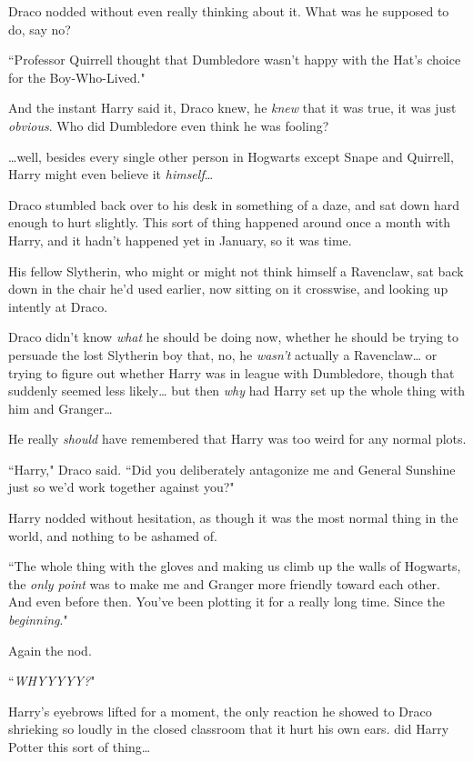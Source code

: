 Draco nodded without even really thinking about it. What was he supposed to do, say no?

``Professor Quirrell thought that Dumbledore wasn't happy with the Hat's choice for the Boy-Who-Lived."

And the instant Harry said it, Draco knew, he \emph{knew} that it was true, it was just \emph{obvious}. Who did Dumbledore even think he was fooling?

{\ldots}well, besides every single other person in Hogwarts except Snape and Quirrell, Harry might even believe it \emph{himself}{\ldots}

Draco stumbled back over to his desk in something of a daze, and sat down hard enough to hurt slightly. This sort of thing happened around once a month with Harry, and it hadn't happened yet in January, so it was time.

His fellow Slytherin, who might or might not think himself a Ravenclaw, sat back down in the chair he'd used earlier, now sitting on it crosswise, and looking up intently at Draco.

Draco didn't know \emph{what} he should be doing now, whether he should be trying to persuade the lost Slytherin boy that, no, he \emph{wasn't} actually a Ravenclaw{\ldots} or trying to figure out whether Harry was in league with Dumbledore, though that suddenly seemed less likely{\ldots} but then \emph{why} had Harry set up the whole thing with him and Granger{\ldots}

He really \emph{should} have remembered that Harry was too weird for any normal plots.

``Harry," Draco said. ``Did you deliberately antagonize me and General Sunshine just so we'd work together against you?"

Harry nodded without hesitation, as though it was the most normal thing in the world, and nothing to be ashamed of.

``The whole thing with the gloves and making us climb up the walls of Hogwarts, the \emph{only point} was to make me and Granger more friendly toward each other. And even before then. You've been plotting it for a really long time. Since the \emph{beginning}."

Again the nod.

``\emph{WHYYYYY?}"

Harry's eyebrows lifted for a moment, the only reaction he showed to Draco shrieking so loudly in the closed classroom that it hurt his own ears.  did Harry Potter  this sort of thing{\ldots}

